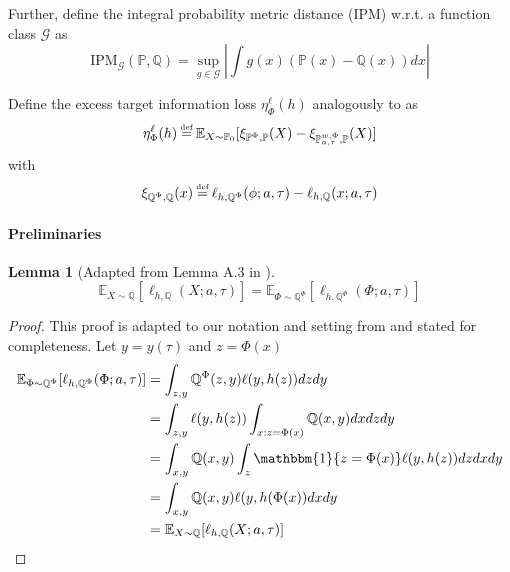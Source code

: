 \documentclass{article}
\newtheorem{lemma}{Lemma}
\newcommand{\IPM}{\text{IPM}}
\newcommand\defeq{\mathrel{\stackrel{\makebox[0pt]{\mbox{\normalfont\tiny def}}}{=}}}
\begin{document}
Further, define the integral probability metric distance (IPM) w.r.t. a function class $\mathcal{G}$ as 
\begin{equation}
    \IPM_\mathcal{G}(\mathbb{P}, \mathbb{Q}) = \sup_{g\in \mathcal{G}}\left|\int g(x) (\mathbb{P}(x) - \mathbb{Q}(x))dx\right|
\end{equation}


Define the excess target information loss $\eta^{\ell}_\Phi(h)$ analogously to \cite{johansson2019support} as 
\begin{equation}
    \eta^{\ell}_\Phi(h) \defeq \mathbb{E}_{X\sim \mathbb{P}_0}[\xi_{\mathbb{P}^\Phi, \mathbb{P}}(X) - \xi_{\mathbb{P}^{w,\Phi}_{a, \tau}, \mathbb{P}}(X)]
\end{equation}
  with 
 \begin{equation}
\xi_{ \mathbb{Q}^\Phi, \mathbb{Q}}(x) \defeq  \ell_{h, \mathbb{Q}^\Phi}(\phi; a, \tau) - \ell_{h, \mathbb{Q}}(x; a, \tau)
 \end{equation} 
 
\paragraph{Preliminaries}
\begin{lemma}[Adapted from Lemma A.3 in \cite{johansson2019support}]\label{lemma:1}
\begin{equation*}
\mathbb{E}_{X \sim \mathbb{Q}}[\ell_{h, \mathbb{Q}}(X; a, \tau)] = \mathbb{E}_{\Phi \sim \mathbb{Q}^\Phi}[\ell_{h, \mathbb{Q}^\Phi}(\Phi; a, \tau)]
\end{equation*}
\end{lemma}
\begin{proof} This proof is adapted to our notation and setting from \cite{johansson2019support} and stated for completeness. Let $y=y(\tau)$ and $z=\Phi(x)$
 \begin{equation*}
 \begin{split}
\mathbb{E}_{\Phi \sim \mathbb{Q}^\Phi}[\ell_{h, \mathbb{Q}^\Phi}(\Phi; a, \tau)] 
&= \int_{z, y} \mathbb{Q}^\Phi(z, y) \ell(y, h(z))dz dy \\
&=\int_{z, y}  \ell(y, h(z)) \int_{x:  z = \Phi(x)} \mathbb{Q}(x, y) dxdzdy  \\
&=\int_{x, y} \mathbb{Q}(x, y) \int_z \mathbbm{1}\{z=\Phi(x)\} \ell(y, h(z)) dzdxdy \\
&= \int_{x, y} \mathbb{Q}(x, y) \ell(y, h(\Phi(x))dxdy \\
&= \mathbb{E}_{X \sim \mathbb{Q}}[\ell_{h, \mathbb{Q}}(X; a, \tau)]
\end{split}
\end{equation*}
\end{proof}
\end{document}
